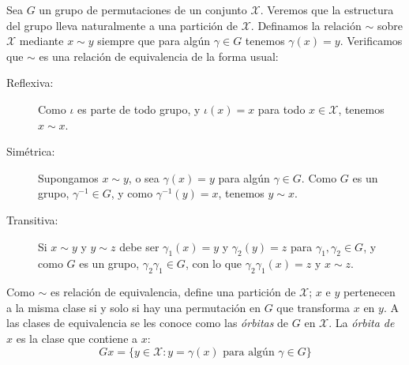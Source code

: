   Sea \(G\) un grupo de permutaciones
  de un conjunto \(\mathcal{X}\).
  Veremos que la estructura del grupo
  lleva naturalmente a una partición de \(\mathcal{X}\).
  Definamos la relación \(\sim\) sobre \(\mathcal{X}\) mediante
  \(x \sim y\) siempre que para algún \(\gamma \in G\)
  tenemos \(\gamma(x) = y\).
  Verificamos que \(\sim\)
  es una relación de equivalencia de la forma usual:%
  \begin{description}
  \item[Reflexiva:]
    Como \(\iota\) es parte de todo grupo,
    y \(\iota(x) = x\) para todo \(x \in \mathcal{X}\),
    tenemos \(x \sim x\).
  \item[Simétrica:]
    Supongamos \(x \sim y\),
    o sea \(\gamma(x) = y\) para algún \(\gamma \in G\).
    Como \(G\) es un grupo,
    \(\gamma^{-1} \in G\),
    y como \(\gamma^{-1}(y) = x\),
    tenemos \(y \sim x\).
  \item[Transitiva:]
    Si \(x \sim y\) y \(y \sim z\)
    debe ser \(\gamma_1(x) = y\) y \(\gamma_2(y) = z\)
    para \(\gamma_1, \gamma_2 \in G\),
    y como \(G\) es un grupo,
    \(\gamma_2 \gamma_1 \in G\),
    con lo que \(\gamma_2 \gamma_1 (x) = z\)
    y \(x \sim z\).
  \end{description}
  Como \(\sim\) es relación de equivalencia,
  define una partición de \(\mathcal{X}\);
  \(x\) e \(y\) pertenecen a la misma clase
  si y solo si hay una permutación en \(G\)
  que transforma \(x\) en \(y\).
  A las clases de equivalencia
  se les conoce como las \emph{órbitas} de \(G\) en \(\mathcal{X}\).
  La \emph{órbita de \(x\)} es la clase que contiene a \(x\):
  \begin{equation*}
    G x
      = \{y \in \mathcal{X} \colon y = \gamma(x)
	       \text{\ para algún\ } \gamma \in G\}
  \end{equation*}


